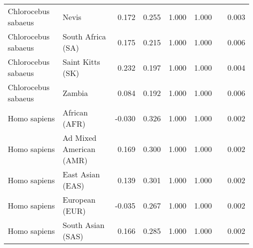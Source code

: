 \begin{center}
\begin{adjustbox}{width = 1\textwidth}
\begin{tabular}{|l|l|r|r|r|r|r|}
 Chlorocebus sabaeus &                           Nevis &                                              0.172 &                                              0.255 &                1.000 &                                  1.000~~ &              0.003 \\
 Chlorocebus sabaeus &               South Africa (SA) &                                              0.175 &                                              0.215 &                1.000 &                                  1.000~~ &              0.006 \\
 Chlorocebus sabaeus &                Saint Kitts (SK) &                                              0.232 &                                              0.197 &                1.000 &                                  1.000~~ &              0.004 \\
 Chlorocebus sabaeus &                          Zambia &                                              0.084 &                                              0.192 &                1.000 &                                  1.000~~ &              0.006 \\
        Homo sapiens &                   African (AFR) &                                             -0.030 &                                              0.326 &                1.000 &                                  1.000~~ &              0.002 \\
        Homo sapiens &         Ad Mixed American (AMR) &                                              0.169 &                                              0.300 &                1.000 &                                  1.000~~ &              0.002 \\
        Homo sapiens &                East Asian (EAS) &                                              0.139 &                                              0.301 &                1.000 &                                  1.000~~ &              0.002 \\
        Homo sapiens &                  European (EUR) &                                             -0.035 &                                              0.267 &                1.000 &                                  1.000~~ &              0.002 \\
        Homo sapiens &               South Asian (SAS) &                                              0.166 &                                              0.285 &                1.000 &                                  1.000~~ &              0.002 \\
\bottomrule
\end{tabular}
\end{adjustbox}
\newpage
\end{center}
